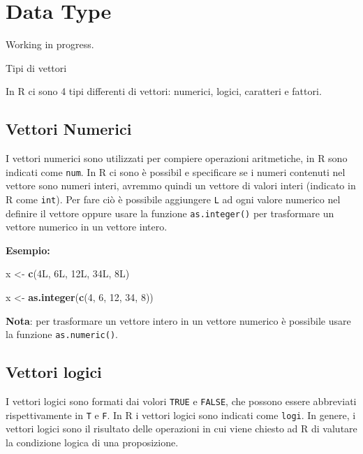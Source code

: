 \documentclass[
]{book}
\newenvironment{Shaded}{\begin{snugshade}}{\end{snugshade}}
\newcommand{\DecValTok}[1]{\textcolor[rgb]{0.00,0.00,0.81}{#1}}
\newcommand{\KeywordTok}[1]{\textcolor[rgb]{0.13,0.29,0.53}{\textbf{#1}}}
\newcommand{\NormalTok}[1]{#1}
\newcommand{\StringTok}[1]{\textcolor[rgb]{0.31,0.60,0.02}{#1}}
\begin{document}
\hypertarget{data-type}{%
\section{Data Type}\label{data-type}}

Working in progress.

Tipi di vettori

In R ci sono 4 tipi differenti di vettori: numerici, logici, caratteri e fattori.

\hypertarget{vettori-numerici}{%
\subsection{Vettori Numerici}\label{vettori-numerici}}

I vettori numerici sono utilizzati per compiere operazioni aritmetiche, in R sono indicati come \texttt{num}. In R ci sono è possibil e specificare se i numeri contenuti nel vettore sono numeri interi, avremmo quindi un vettore di valori interi (indicato in R come \texttt{int}). Per fare ciò è possibile aggiungere \texttt{L} ad ogni valore numerico nel definire il vettore oppure usare la funzione \texttt{as.integer()} per trasformare un vettore numerico in un vettore intero.

\textbf{Esempio:}

\begin{Shaded}
\begin{Highlighting}[]
\NormalTok{x <-}\StringTok{ }\KeywordTok{c}\NormalTok{(4L, 6L, 12L, 34L, 8L)}

\NormalTok{x <-}\StringTok{ }\KeywordTok{as.integer}\NormalTok{(}\KeywordTok{c}\NormalTok{(}\DecValTok{4}\NormalTok{, }\DecValTok{6}\NormalTok{, }\DecValTok{12}\NormalTok{, }\DecValTok{34}\NormalTok{, }\DecValTok{8}\NormalTok{))}
\end{Highlighting}
\end{Shaded}

\textbf{Nota}: per trasformare un vettore intero in un vettore numerico è possibile usare la funzione \texttt{as.numeric()}.

\hypertarget{vettori-logici}{%
\subsection{Vettori logici}\label{vettori-logici}}

I vettori logici sono formati dai volori \texttt{TRUE} e \texttt{FALSE}, che possono essere abbreviati rispettivamente in \texttt{T} e \texttt{F}. In R i vettori logici sono indicati come \texttt{logi}. In genere, i vettori logici sono il risultato delle operazioni in cui viene chiesto ad R di valutare la condizione logica di una proposizione.
\end{document}
